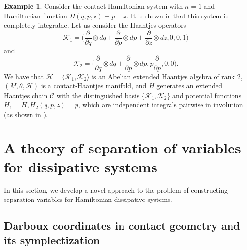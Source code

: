 \documentclass[10pt]{amsart}
\numberwithin{equation}{section}
\newcommand{\bs}{\boldsymbol}
\theoremstyle{definition}
\newtheorem{example}{\textbf{Example}}
\begin{document}
\begin{example}
Consider the contact Hamiltonian system with $n=1$ and Hamiltonian function $H(q,p,z)=p-z$. It is shown in \cite{CLLL2023pr,CLEL2025homogeneous}  that this system is completely integrable. Let us consider the Haantjes operators
\begin{equation}
\bs{\mathcal{K}}_{1}=\bigg(\frac{\partial}{\partial q}\otimes dq+\frac{\partial}{\partial p}\otimes dp+\frac{\partial}{\partial z}\otimes dz,0,0,1 \bigg)
\end{equation}
and
\begin{equation}
\bs{\mathcal{K}}_{2}=\bigg(\frac{\partial}{\partial q}\otimes dq+\frac{\partial}{\partial p}\otimes dp,p\frac{\partial}{\partial p},0,0\bigg).
\end{equation}
We have that $\mathscr{H}=\langle \bs{\mathcal{K}}_{1},\bs{\mathcal{K}}_{2}\rangle$ is an Abelian extended Haantjes algebra of rank $2$, $(M,\theta,\mathscr{H})$ is a contact-Haantjes manifold, and $H$ generates an extended Haantjes chain $\mathscr{C}$ with the distinguished basis $\lbrace \bs{\mathcal{K}}_{1},\bs{\mathcal{K}}_{2} \rbrace$ and potential functions $H_{1}=H,H_{2}(q,p,z)=p$, which are independent integrals pairwise in involution (as shown in \cite{CLLL2023pr,CLEL2025homogeneous}).
\end{example}





\section{A theory of separation of variables for dissipative systems}
\label{sec6}

In this section, we develop a novel approach to the problem of constructing separation variables for Hamiltonian dissipative systems. 

\subsection{Darboux coordinates in contact geometry and its symplectization}
\end{document}
